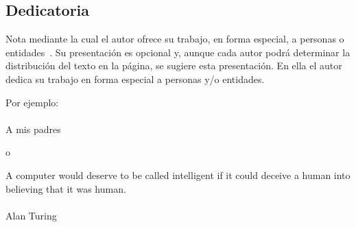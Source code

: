 \subsection*{Dedicatoria}
\vspace*{1.5cm}
{\hfill
    \begin{minipage}{0.5\textwidth}
        \noindent
         Nota mediante la cual el autor ofrece su trabajo, en forma especial, a personas o entidades~\cite{NTC14862008}. Su presentación es opcional y, aunque cada autor podrá determinar la distribución del texto en la página, se sugiere esta presentación. En ella el autor dedica su trabajo en forma especial a personas y/o entidades.\\
         \vspace*{0.5cm}
         
         Por ejemplo:\\
         \\
         A mis padres\\
         \vspace*{1.0cm}
         
         o\\
         \vspace*{1.0cm}
         
        A computer would deserve to be called intelligent if it could deceive a human into believing that it was human.\\\\
        Alan Turing\\
    
    \end{minipage}
}
\newpage
